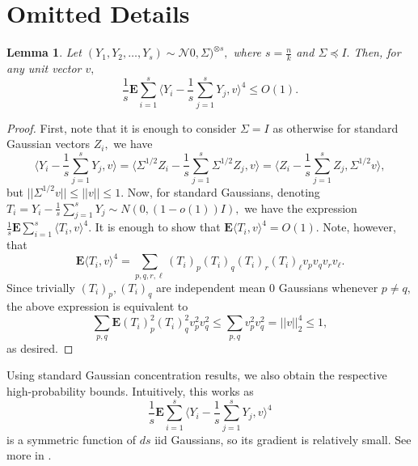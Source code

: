 \documentclass[12pt]{article}%
\newtheorem{lemma}[theorem]{Lemma}
\newcommand{\expect}{\mathbf{E}}
\newcommand{\normal}{\mathcal{N}}
\begin{document}
\section{Omitted Details}
\begin{lemma}
\label{lem:tensornormfour}
Let $(Y_1, Y_2, \ldots, Y_{s}) \sim \normal 0, \Sigma)^{\otimes s},$ where $s = \frac{n}{k}$ and $\Sigma\preceq I.$ Then, for any unit vector $v,$
$$
\frac{1}{s}\expect 
\sum_{i = 1}^s \langle Y_i - \frac{1}{s}\sum_{j = 1}^s
Y_j, v\rangle^4\le O(1). 
$$
\end{lemma}
\begin{proof}
First, note that it is enough to consider $\Sigma = I$ as otherwise for standard Gaussian vectors $Z_i,$ we have
$$
\langle Y_i - \frac{1}{s}\sum_{j = 1}^s
Y_j, v\rangle = 
\langle \Sigma^{1/2} Z_i - \frac{1}{s}\sum_{j = 1}^s
\Sigma^{1/2}Z_j, v\rangle = 
\langle Z_i - \frac{1}{s}\sum_{j = 1}^s
Z_j,\Sigma^{1/2} v\rangle,
$$
but $||\Sigma^{1/2} v||\le ||v||\le 1.$ Now, for standard Gaussians, denoting \linebreak $T_i = Y_i - \frac{1}{s}\sum_{j = 1}^s
Y_j\sim N(0, (1 - o(1))I),$
we have the expression
$
\displaystyle
\frac{1}{s}\expect 
\sum_{i = 1}^s \langle T_i, v\rangle^4.
$
It is enough to show that $\expect\langle T_i, v\rangle^4 = O(1).$ Note, however, that 
$$
\expect\langle T_i, v\rangle^4 = 
\sum_{p,q,r,\ell}
(T_i)_p(T_i)_q(T_i)_r(T_i)_\ell v_pv_qv_rv_\ell.
$$
Since trivially $(T_i)_p,(T_i)_q$ are independent mean 0 Gaussians whenever $p \neq q,$ the above expression is equivalent to 
$$
\sum_{p,q}
\expect
(T_i)^2_p(T_i)^2_qv_p^2v_q^2 \le 
\sum_{p,q}
v_p^2v_q^2
= ||v||_2^4\le 1,
$$
as desired.
\end{proof}

\noindent
Using standard Gaussian concentration results, we also obtain the respective high-probability bounds. Intuitively, this works as 
$$
\frac{1}{s}\expect 
\sum_{i = 1}^s \langle Y_i - \frac{1}{s}\sum_{j = 1}^s
Y_j, v\rangle^4
$$
is a symmetric function of $ds$ iid Gaussians, so its gradient is relatively small. See more in \cite{Kothari2018RobustME}.
\end{document}
